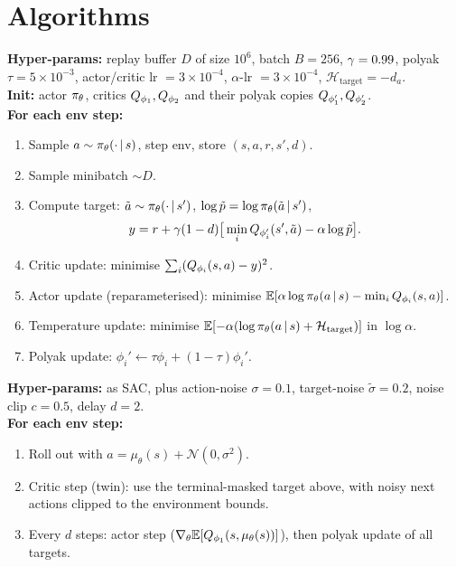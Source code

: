 \documentclass[11pt,oneside]{scrbook}
\begin{document}
\chapter{Algorithms}

\begin{tcolorbox}[colback=rlbg, colframe=rlblue, title=\textbf{SAC with automatic temperature}]
\textbf{Hyper-params:} replay buffer $D$ of size $10^6$, batch $B=256$, $\gamma=0.99$, polyak $\tau=5\times 10^{-3}$, actor/critic lr $=3\times 10^{-4}$, $\alpha$-lr $=3\times 10^{-4}$, $\mathcal{H}_\text{target} = -d_a$.\\
\textbf{Init:} actor $\pi_\theta$, critics $Q_{\phi_1}, Q_{\phi_2}$ and their polyak copies $Q_{\phi_1'}, Q_{\phi_2'}$.\\
\textbf{For each env step:}
\begin{enumerate}[leftmargin=*]
  \item Sample $a \sim \pi_\theta(\cdot\,\vert\, s)$, step env, store $(s, a, r, s', d)$.
  \item Sample minibatch $\sim D$.
  \item Compute target: $\tilde a \sim \pi_\theta(\cdot\,\vert\, s')$, $\log\tilde p = \log\pi_\theta(\tilde a\,\vert\, s')$,
        \[
          y = r + \gamma (1-d)\big[\min_i Q_{\phi_i'}(s', \tilde a) - \alpha \log\tilde p\big].
        \]
  \item Critic update: minimise $\sum_i (Q_{\phi_i}(s,a) - y)^2$.
  \item Actor update (reparameterised): minimise $\mathbb{E}[\alpha \log\pi_\theta(a\,\vert\, s) - \min_i Q_{\phi_i}(s,a)]$.
  \item Temperature update: minimise $\mathbb{E}[-\alpha (\log\pi_\theta(a\,\vert\, s) + \mathcal{H}_\text{target})]$ in $\log\alpha$.
  \item Polyak update: $\phi_i' \leftarrow \tau \phi_i + (1-\tau)\phi_i'$.
\end{enumerate}
\end{tcolorbox}

\begin{tcolorbox}[colback=rlbg, colframe=rlblue, title=\textbf{TD3}]
\textbf{Hyper-params:} as SAC, plus action-noise $\sigma=0.1$, target-noise $\tilde\sigma=0.2$, noise clip $c=0.5$, delay $d=2$.\\
\textbf{For each env step:}
\begin{enumerate}[leftmargin=*]
  \item Roll out with $a = \mu_\theta(s) + \mathcal{N}(0, \sigma^2)$.
  \item Critic step (twin): use the terminal-masked target above, with noisy next actions clipped
        to the environment bounds.
  \item Every $d$ steps: actor step ($\nabla_\theta \mathbb{E}[Q_{\phi_1}(s, \mu_\theta(s))]$), then polyak update of all targets.
\end{enumerate}
\end{tcolorbox}
\end{document}
